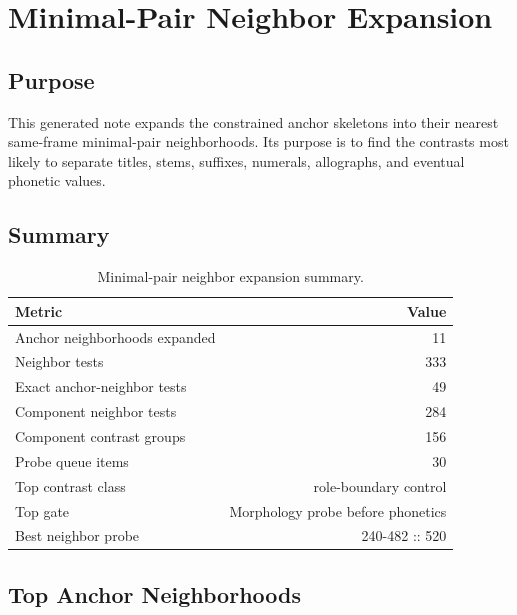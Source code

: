 \section{Minimal-Pair Neighbor Expansion}

\subsection{Purpose}

This generated note expands the constrained anchor skeletons into their nearest same-frame minimal-pair neighborhoods. Its purpose is to find the contrasts most likely to separate titles, stems, suffixes, numerals, allographs, and eventual phonetic values.

\subsection{Summary}

\begin{table}[htbp]
\centering
\begin{tabular}{p{}r}
\toprule
\textbf{Metric} & \textbf{Value} \\
\midrule
Anchor neighborhoods expanded & 11 \\
Neighbor tests & 333 \\
Exact anchor-neighbor tests & 49 \\
Component neighbor tests & 284 \\
Component contrast groups & 156 \\
Probe queue items & 30 \\
Top contrast class & role-boundary control \\
Top gate & Morphology probe before phonetics \\
Best neighbor probe & 240-482 :: 520 \\
\bottomrule
\end{tabular}
\caption{Minimal-pair neighbor expansion summary.}
\end{table}

\subsection{Top Anchor Neighborhoods}

